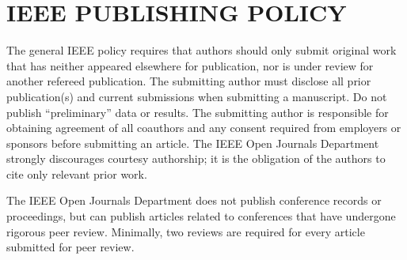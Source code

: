 \section{IEEE PUBLISHING POLICY}
The general IEEE policy requires that authors should only submit original 
work that has neither appeared elsewhere for publication, nor is under 
review for another refereed publication. The submitting author must disclose 
all prior publication(s) and current submissions when submitting a 
manuscript. Do not publish ``preliminary'' data or results. The submitting 
author is responsible for obtaining agreement of all coauthors and any 
consent required from employers or sponsors before submitting an article. 
The IEEE Open Journals Department strongly discourages courtesy authorship; 
it is the obligation of the authors to cite only relevant prior work.

The IEEE Open Journals Department does not publish conference records or 
proceedings, but can publish articles related to conferences that have 
undergone rigorous peer review. Minimally, two reviews are required for 
every article submitted for peer review.